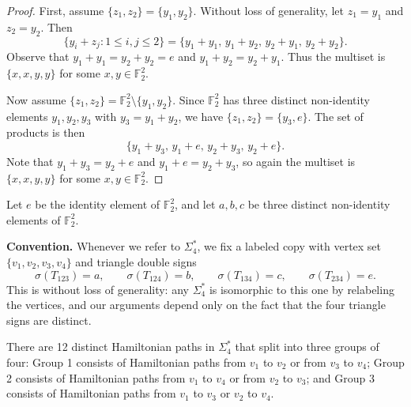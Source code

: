 \documentclass[12pt]{amsart}
\theoremstyle{plain}
\theoremstyle{definition}%
\begin{document}
\begin{proof}
First, assume $\{z_1, z_2\} = \{y_1, y_2\}$.  
Without loss of generality, let $z_1 = y_1$ and $z_2 = y_2$. Then
\[
\{y_i +z_j : 1 \le i, j \le 2\} = \{y_1+y_1,\, y_1+y_2,\, y_2+y_1,\, y_2+y_2\}.
\]
Observe that $y_1+y_1 = y_2+y_2 = e$ and $y_1+y_2 = y_2+y_1$.  
Thus the multiset is $\{x, x, y, y\}$ for some $x, y \in \mathbb{F}_2^2$.

Now assume $\{z_1, z_2\} = \mathbb{F}_2^2 \setminus \{y_1, y_2\}$.  
Since $\mathbb{F}_2^2$ has three distinct non-identity elements $y_1, y_2, y_3$ with $y_3 = y_1+y_2$, we have $\{z_1, z_2\} = \{y_3, e\}$.  
The set of products is then
\[
\{y_1+y_3,\, y_1+e,\, y_2+y_3,\, y_2+e\}.
\]
Note that $y_1+y_3 = y_2+e$ and $y_1+e = y_2+y_3$, so again the multiset is $\{x, x, y, y\}$ for some $x, y \in \mathbb{F}_2^2$.
\end{proof}



Let $e$ be the identity element of $\mathbb{F}_2^2$, and let $a,b,c$ be three distinct non-identity elements of $\mathbb{F}_2^2$. 

\textbf{Convention.}
Whenever we refer to \(\Sigma_4^*\), we fix a labeled copy with vertex set
\(\{v_1,v_2,v_3,v_4\}\) and triangle double signs
\[
\sigma(T_{123})=a,\qquad \sigma(T_{124})=b,\qquad
\sigma(T_{134})=c,\qquad \sigma(T_{234})=e .
\]
This is without loss of generality: any \(\Sigma_4^*\) is isomorphic to this one
by relabeling the vertices, and our arguments depend only on the fact that the
four triangle signs are distinct.



 There are 12 distinct Hamiltonian paths in $\Sigma_4^*$ that split into three groups of four: Group 1 consists of Hamiltonian paths from $v_1$ to $v_2$ or from $v_3$ to $v_4$; Group 2 consists of Hamiltonian paths from $v_1$ to $v_4$ or from $v_2$ to $v_3$; and Group 3 consists of Hamiltonian paths from $v_1$ to $v_3$ or $v_2$ to $v_4$.
\end{document}
